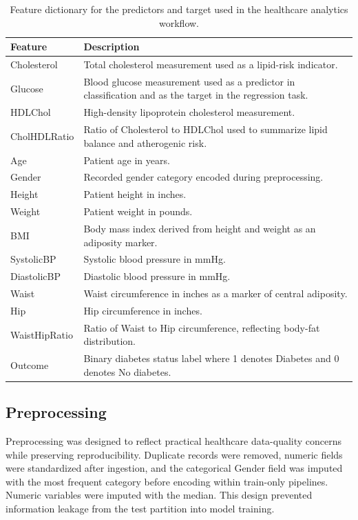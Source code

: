 \documentclass[conference]{IEEEtran}
\begin{document}
\begin{table}[!t]
\centering
\caption{Feature dictionary for the predictors and target used in the healthcare analytics workflow.}
\label{tab:feature-dictionary}
\footnotesize
\setlength{\tabcolsep}{4pt}
\renewcommand{\arraystretch}{1.12}
\begin{tabular}{p{2.5cm} p{13.2cm}}
\toprule
Feature & Description \\
\midrule
Cholesterol & Total cholesterol measurement used as a lipid-risk indicator. \\
Glucose & Blood glucose measurement used as a predictor in classification and as the target in the regression task. \\
HDLChol & High-density lipoprotein cholesterol measurement. \\
CholHDLRatio & Ratio of Cholesterol to HDLChol used to summarize lipid balance and atherogenic risk. \\
Age & Patient age in years. \\
Gender & Recorded gender category encoded during preprocessing. \\
Height & Patient height in inches. \\
Weight & Patient weight in pounds. \\
BMI & Body mass index derived from height and weight as an adiposity marker. \\
SystolicBP & Systolic blood pressure in mmHg. \\
DiastolicBP & Diastolic blood pressure in mmHg. \\
Waist & Waist circumference in inches as a marker of central adiposity. \\
Hip & Hip circumference in inches. \\
WaistHipRatio & Ratio of Waist to Hip circumference, reflecting body-fat distribution. \\
Outcome & Binary diabetes status label where 1 denotes Diabetes and 0 denotes No diabetes. \\
\bottomrule
\end{tabular}
\end{table}

\subsection{Preprocessing}
Preprocessing was designed to reflect practical healthcare data-quality concerns while preserving reproducibility. Duplicate records were removed, numeric fields were standardized after ingestion, and the categorical Gender field was imputed with the most frequent category before encoding within train-only pipelines. Numeric variables were imputed with the median. This design prevented information leakage from the test partition into model training.
\end{document}
